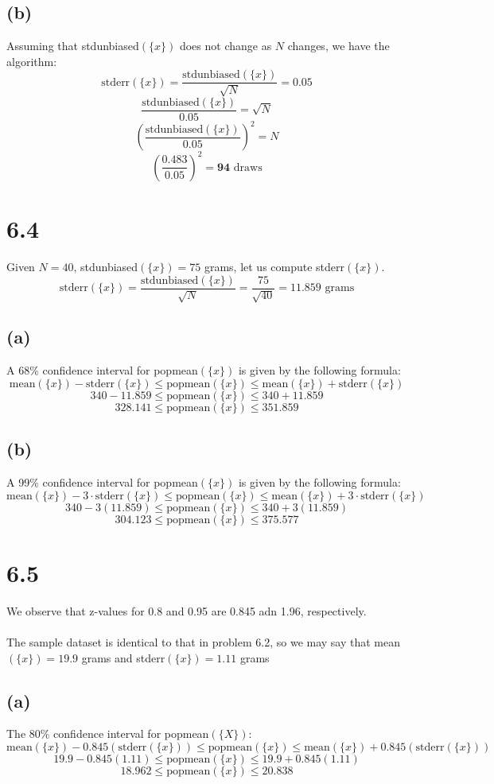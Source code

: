 \documentclass[11pt]{article}
\begin{document}
\subsection*{(b)}
Assuming that stdunbiased$(\{x\})$ does not change as $N$ changes, we have the algorithm:
\[\text{stderr}(\{x\})=\frac{\text{stdunbiased}(\{x\})}{\sqrt{N}}=0.05\]
\[\frac{\text{stdunbiased}(\{x\})}{0.05}=\sqrt{N}\]
\[\left(\frac{\text{stdunbiased}(\{x\})}{0.05}\right)^2=N\]
\[\left(\frac{0.483}{0.05}\right)^2=\textbf{94}\text{ draws}\]
\section*{6.4}
Given $N=40$, stdunbiased$(\{x\})=75$ grams, let us compute stderr$(\{x\})$.
\[\text{stderr}(\{x\})=\frac{\text{stdunbiased}(\{x\})}{\sqrt{N}}=\frac{75}{\sqrt{40}}=11.859\text{ grams}\]
\subsection*{(a)}
A 68\% confidence interval for popmean$(\{x\})$ is given by the following formula:
\[\text{mean}(\{x\})-\text{stderr}(\{x\})\leq\text{popmean}(\{x\})\leq\text{mean}(\{x\})+\text{stderr}(\{x\})\]
\[340-11.859\leq\text{popmean}(\{x\})\leq340+11.859\]
\[328.141\leq\text{popmean}(\{x\})\leq351.859\]
\subsection*{(b)}
A 99\% confidence interval for popmean$(\{x\})$ is given by the following formula:
\[\text{mean}(\{x\})-3\cdot\text{stderr}(\{x\})\leq\text{popmean}(\{x\})\leq\text{mean}(\{x\})+3\cdot\text{stderr}(\{x\})\]
\[340-3(11.859)\leq\text{popmean}(\{x\})\leq340+3(11.859)\]
\[304.123\leq\text{popmean}(\{x\})\leq375.577\]
\clearpage
\section*{6.5}
We observe that z-values for 0.8 and 0.95 are 0.845 adn 1.96, respectively. \\ \\
The sample dataset is identical to that in problem 6.2, so we may say that mean$(\{x\})=19.9$ grams and stderr$(\{x\})=1.11$ grams
\subsection*{(a)}
The 80\% confidence interval for popmean$(\{X\})$:
\[\text{mean}(\{x\})-0.845(\text{stderr}(\{x\}))\leq\text{popmean}(\{x\})\leq\text{mean}(\{x\})+0.845(\text{stderr}(\{x\}))\]
\[19.9-0.845(1.11)\leq\text{popmean}(\{x\})\leq19.9+0.845(1.11)\]
\[18.962\leq\text{popmean}(\{x\})\leq20.838\]
\end{document}
